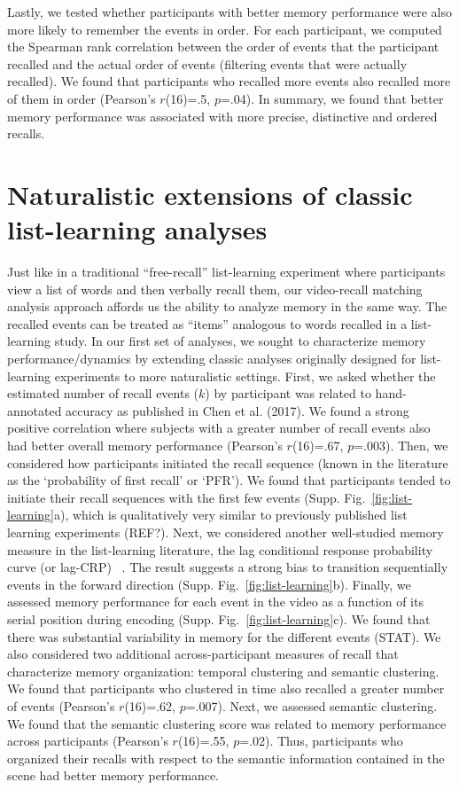 \documentclass{article}
\begin{document}
{Lastly, we tested whether participants with better memory performance were also more likely to remember the events in order.  For each participant, we computed the Spearman rank correlation between the order of events that the participant recalled and the actual order of events (filtering events that were actually recalled).  We found that participants who recalled more events also recalled more of them in order (Pearson's $r$(16)=.5, $p$=.04). In summary, we found that better memory performance was associated with more precise, distinctive and ordered recalls.

\section{Naturalistic extensions of classic list-learning analyses}
Just like in a traditional ``free-recall'' list-learning experiment where participants view a list of words and then verbally recall them, our video-recall matching analysis approach affords us the ability to analyze memory in the same way. The recalled events can be treated as ``items'' analogous to words recalled in a list-learning study. In our first set of analyses, we sought to characterize memory performance/dynamics by extending classic analyses originally designed for list-learning experiments to more naturalistic settings. First, we asked whether the estimated number of recall events ($k$) by participant was related to hand-annotated accuracy as published in Chen et al. (2017).  We found a strong positive correlation where subjects with a greater number of recall events also had better overall memory performance (Pearson's $r$(16)=.67, $p$=.003). Then, we considered how participants initiated the recall sequence (known in the literature as the `probability of first recall' or `PFR'). We found that participants tended to initiate their recall sequences with the first few events (Supp. Fig.~\ref{fig:list-learning}a), which is qualitatively very similar to previously published list learning experiments (REF?). Next, we considered another well-studied memory measure in the list-learning literature, the lag conditional response probability curve (or lag-CRP) ~\citep{Kaha96}. The result suggests a strong bias to transition sequentially events in the forward direction (Supp. Fig.~\ref{fig:list-learning}b). Finally, we assessed memory performance for each event in the video as a function of its serial position during encoding (Supp. Fig.~\ref{fig:list-learning}c). We found that there was substantial variability in memory for the different events (STAT). We also considered two additional across-participant measures of recall that characterize memory organization: temporal clustering and semantic clustering. We found that participants who clustered in time also recalled a greater number of events (Pearson's $r$(16)=.62, $p$=.007). Next, we assessed semantic clustering. We found that the semantic clustering score was related to memory performance across participants (Pearson's $r$(16)=.55, $p$=.02).  Thus, participants who organized their recalls with respect to the semantic information contained in the scene had better memory performance.


}
\end{document}
